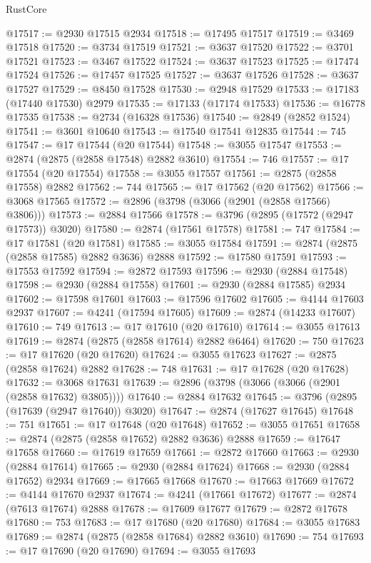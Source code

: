 \begin{lexlean}{RustCore}
\begin{coremodule}
@17517 := @2930 @17515 @2934
@17518 := @17495 @17517
@17519 := @3469 @17518
@17520 := @3734 @17519
@17521 := @3637 @17520
@17522 := @3701 @17521
@17523 := @3467 @17522
@17524 := @3637 @17523
@17525 := @17474 @17524
@17526 := @17457 @17525
@17527 := @3637 @17526
@17528 := @3637 @17527
@17529 := @8450 @17528
@17530 := @2948 @17529
@17533 := @17183 (@17440 @17530) @2979
@17535 := @17133 (@17174 @17533)
@17536 := @16778 @17535
@17538 := @2734 (@16328 @17536)
@17540 := @2849 (@2852 @1524)
@17541 := @3601 @10640
@17543 := @17540 @17541 @12835
@17544 := 745
@17547 := @17 @17544 (@20 @17544)
@17548 := @3055 @17547
@17553 := @2874 (@2875 (@2858 @17548) @2882 @3610)
@17554 := 746
@17557 := @17 @17554 (@20 @17554)
@17558 := @3055 @17557
@17561 := @2875 (@2858 @17558) @2882
@17562 := 744
@17565 := @17 @17562 (@20 @17562)
@17566 := @3068 @17565
@17572 := @2896 (@3798 (@3066 (@2901 (@2858 @17566) @3806)))
@17573 := @2884 @17566
@17578 := @3796 (@2895 (@17572 (@2947 @17573)) @3020)
@17580 := @2874 (@17561 @17578)
@17581 := 747
@17584 := @17 @17581 (@20 @17581)
@17585 := @3055 @17584
@17591 := @2874 (@2875 (@2858 @17585) @2882 @3636) @2888
@17592 := @17580 @17591
@17593 := @17553 @17592
@17594 := @2872 @17593
@17596 := @2930 (@2884 @17548)
@17598 := @2930 (@2884 @17558)
@17601 := @2930 (@2884 @17585) @2934
@17602 := @17598 @17601
@17603 := @17596 @17602
@17605 := @4144 @17603 @2937
@17607 := @4241 (@17594 @17605)
@17609 := @2874 (@14233 @17607)
@17610 := 749
@17613 := @17 @17610 (@20 @17610)
@17614 := @3055 @17613
@17619 := @2874 (@2875 (@2858 @17614) @2882 @6464)
@17620 := 750
@17623 := @17 @17620 (@20 @17620)
@17624 := @3055 @17623
@17627 := @2875 (@2858 @17624) @2882
@17628 := 748
@17631 := @17 @17628 (@20 @17628)
@17632 := @3068 @17631
@17639 := @2896 (@3798 (@3066 (@3066 (@2901 (@2858 @17632) @3805))))
@17640 := @2884 @17632
@17645 := @3796 (@2895 (@17639 (@2947 @17640)) @3020)
@17647 := @2874 (@17627 @17645)
@17648 := 751
@17651 := @17 @17648 (@20 @17648)
@17652 := @3055 @17651
@17658 := @2874 (@2875 (@2858 @17652) @2882 @3636) @2888
@17659 := @17647 @17658
@17660 := @17619 @17659
@17661 := @2872 @17660
@17663 := @2930 (@2884 @17614)
@17665 := @2930 (@2884 @17624)
@17668 := @2930 (@2884 @17652) @2934
@17669 := @17665 @17668
@17670 := @17663 @17669
@17672 := @4144 @17670 @2937
@17674 := @4241 (@17661 @17672)
@17677 := @2874 (@7613 @17674) @2888
@17678 := @17609 @17677
@17679 := @2872 @17678
@17680 := 753
@17683 := @17 @17680 (@20 @17680)
@17684 := @3055 @17683
@17689 := @2874 (@2875 (@2858 @17684) @2882 @3610)
@17690 := 754
@17693 := @17 @17690 (@20 @17690)
@17694 := @3055 @17693

\end{coremodule}
\end{lexlean}
